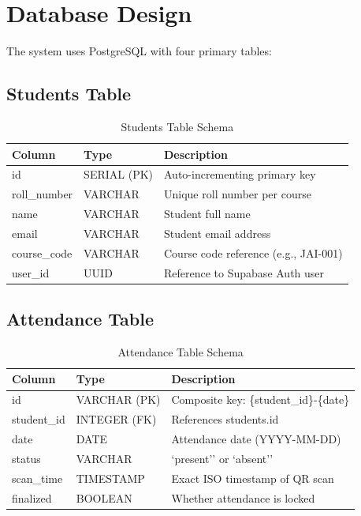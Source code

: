 \documentclass{SOICTthesis}
\begin{document}
\section{Database Design}
\label{sec:database_design}

The system uses PostgreSQL with four primary tables:

\subsection{Students Table}

\begin{table}[H]
\centering
\caption{Students Table Schema}
\label{tab:students_schema}
\begin{tabular}{|l|l|p{6cm}|}
    \hline
    \textbf{Column} & \textbf{Type} & \textbf{Description} \\
    \hline
    id & SERIAL (PK) & Auto-incrementing primary key \\
    \hline
    roll\_number & VARCHAR & Unique roll number per course \\
    \hline
    name & VARCHAR & Student full name \\
    \hline
    email & VARCHAR & Student email address \\
    \hline
    course\_code & VARCHAR & Course code reference (e.g., JAI-001) \\
    \hline
    user\_id & UUID & Reference to Supabase Auth user \\
    \hline
\end{tabular}
\end{table}

\subsection{Attendance Table}

\begin{table}[H]
\centering
\caption{Attendance Table Schema}
\label{tab:attendance_schema}
\begin{tabular}{|l|l|p{6cm}|}
    \hline
    \textbf{Column} & \textbf{Type} & \textbf{Description} \\
    \hline
    id & VARCHAR (PK) & Composite key: \{student\_id\}-\{date\} \\
    \hline
    student\_id & INTEGER (FK) & References students.id \\
    \hline
    date & DATE & Attendance date (YYYY-MM-DD) \\
    \hline
    status & VARCHAR & `present'' or `absent'' \\
    \hline
    scan\_time & TIMESTAMP & Exact ISO timestamp of QR scan \\
    \hline
    finalized & BOOLEAN & Whether attendance is locked \\
    \hline
\end{tabular}
\end{table}
\end{document}
